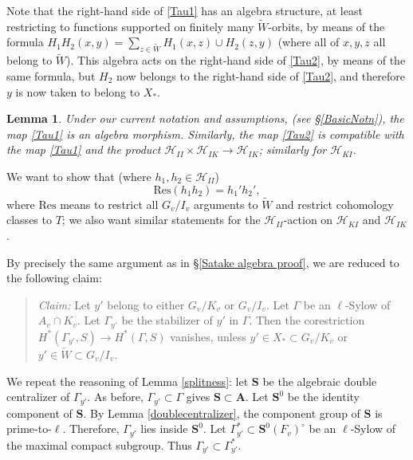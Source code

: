 \documentclass[10pt]{amsart}
\newtheorem{lemma}[subsection]{Lemma}
\theoremstyle{remark}
\begin{document}
 
 Note that the right-hand side of \eqref{Tau1} has an algebra structure,   at least  restricting to functions supported on finitely many $\tilde{W}$-orbits,
 by means of the formula $H_1 H_2 (x,y)=
 \sum_{z \in \tilde{W}} H_1(x,z) \cup H_2(z,y)$ (where all of $x,y,z$ all belong to $\tilde{W}$). 
  This algebra acts on the right-hand side of \eqref{Tau2}, by means 
  of the same formula, but $H_2$ now belongs to the right-hand side of \eqref{Tau2}, 
  and therefore $y$ is now taken to belong to $X_*$. 
  
  
 
 \begin{lemma}
Under our current notation and assumptions,
(see \S \ref{BasicNotn}), 
the map \eqref{Tau1} is an algebra morphism.
 Similarly, the map \eqref{Tau2}  
 is compatible with the  map \eqref{Tau1} and the product $\mathscr{H}_{II} \times \mathscr{H}_{IK} \rightarrow \mathscr{H}_{IK}$;
similarly for $\mathscr{H}_{KI}$.
 \end{lemma}
 
 \proof 
 
 We want to show that (where $h_1,h_2 \in \mathscr{H}_{II}$)
  $$ \mathrm{Res}(h_1 h_2) = h_1'  h_2',$$
 where $\mathrm{Res}$ means to restrict all $G_v/I_v$ arguments to $\tilde{W}$ and restrict cohomology classes to $T$; 
we also want similar statements for the $\mathscr{H}_{II}$-action on $\mathscr{H}_{KI}$ and $\mathscr{H}_{IK}$. 
 
 By precisely the same argument as in \S \ref{Satake algebra proof}, we are reduced to the following claim:
 
%
%
%
%
%
%


 
 \begin{quote} 
{\em Claim:}   
Let $y'$ belong to either $G_v/K_v$ or $G_v/I_v$. Let $\Gamma$ be an $\ell$-Sylow of $A_v \cap K_v$. 
Let $\Gamma_{y'}$ be the stabilizer of $y'$ in $\Gamma$.
Then
 the corestriction $H^*(\Gamma_{y'}, S) \rightarrow H^*(\Gamma, S)$ vanishes, 
 unless $y' \in X_* \subset G_v/K_v$ or $y' \in \tilde{W} \subset G_v/I_v$.  \end{quote}
 

 
 
 
We repeat
the reasoning of Lemma \ref{splitness}:  let $\mathbf{S}$ be the algebraic double centralizer 
 of  $\Gamma_{y'}$.  As before, $\Gamma_{y'} \subset \Gamma$ gives $\mathbf{S} \subset \mathbf{A}$. 
Let $\mathbf{S}^0$ be the identity component of $\mathbf{S}$. By Lemma  \ref{doublecentralizer},  the component group of $\mathbf{S}$ is prime-to-$\ell$. Therefore,  
$\Gamma_{y'}$ lies inside $\mathbf{S}^0$. Let $\Gamma_{y'}^* \subset \mathbf{S}^0(F_v)^{\circ}$ be an $\ell$-Sylow of the maximal compact subgroup.  Thus $\Gamma_{y'} \subset \Gamma_{y'}^*$.
%
\end{document}
